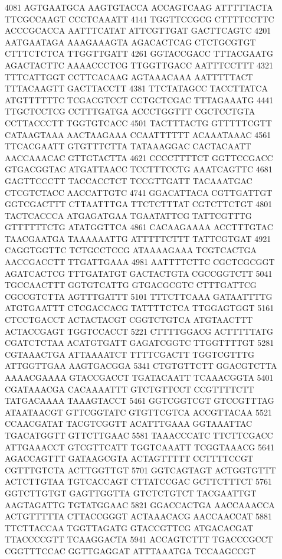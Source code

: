 \begin{addmargin}{0.1\textwidth}
\begin{footnotesize}
\begin{LVerbatim}[commandchars=\\\{\}]
\color{red}4081 AGTGAATGCA AAGTGTACCA ACCAGTCAAG ATTTTTACTA TTCGCCAAGT CCCTCAAATT 
\color{red}4141 TGGTTCCGCG CTTTTCCTTC ACCCGCACCA AATTTCATAT ATTCGTTGAT GACTTCAGTC 
\color{red}4201 AATGAATAGA AAAGAAAGTA AGACACTCAG CTCTGCGTGT CTTTCTCTCA TTGGTTGATT 
\color{red}4261 GGTACCGACC TTTACGAATG AGACTACTTC AAAACCCTCG TTGGTTGACC AATTTCCTTT 
\color{red}4321 TTTCATTGGT CCTTCACAAG AGTAAACAAA AATTTTTACT TTTACAAGTT GACTTACCTT 
\color{red}4381 TTCTATAGCC TACCTTATCA ATGTTTTTTC TCGACGTCCT CCTGCTCGAC TTTAGAAATG 
\color{red}4441 TTGCTCCTCG CCTTTGATGA ACCCTGGTTT CGCTCCTGTA CCTTACCCTT TGGTGTCACC 
\color{red}4501 TACTTTACTG GTTTTTCGTT CATAAGTAAA AACTAAGAAA CCAATTTTTT ACAAATAAAC 
\color{red}4561 TTCACGAATT GTGTTTCTTA TATAAAGGAC CACTACAATT AACCAAACAC GTTGTACTTA 
\color{red}4621 CCCCTTTTCT GGTTCCGACC GTGACGGTAC ATGATTAACC TCCTTTCCTG AAATCAGTTC 
\color{red}4681 GAGTTCCCTT TACCACCTCT TCCGTTGATT TACAAATGAC CTCGTCTACC AACCATTGTC 
\color{red}4741 GGACATTACA CGTTGATTGT GGTCGACTTT CTTAATTTGA TTCTCTTTAT CGTCTTCTGT 
\color{red}4801 TACTCACCCA ATGAGATGAA TGAATATTCG TATTCGTTTG GTTTTTTCTG ATATGGTTCA 
\color{red}4861 CACAAGAAAA ACCTTTGTAC TAACGAATGA TAAAAAATTG ATTTTTCTTT TATTCGTGAT 
\color{red}4921 CAGGTGGTTC TCTGCCTCCG ATAAAAGAAA TCGTCACTGA AACCGACCTT TTGATTGAAA 
\color{red}4981 AATTTTCTTC CGCTCGCGGT AGATCACTCG TTTGATATGT GACTACTGTA CGCCGGTCTT 
\color{red}5041 TGCCAACTTT GGTGTCATTG GTGACGCGTC CTTTGATTCG CGCCGTCTTA AGTTTGATTT 
\color{red}5101 TTTCTTCAAA GATAATTTTG ATGTGAATTT CTCGACCACG TATTTTCTCA TTGGAGTGGT 
\color{red}5161 CTCCTGACCT ACTACTACGT CGGTCTGTCA ATGTAACTTT ACTACCGAGT TGGTCCACCT 
\color{red}5221 CTTTTGGACG ACTTTTTATG CGATCTCTAA ACATGTGATT GAGATCGGTC TTGGTTTTGT 
\color{red}5281 CGTAAACTGA ATTAAAATCT TTTTCGACTT TGGTCGTTTG ATTGGTTGAA AAGTGACGGA 
\color{red}5341 CTGTGTTCTT GGACGTCTTA AAAACGAAAA GTACCGACCT TGATACAATT TCAAACGGTA 
\color{red}5401 CGATAAACGA CACAAAATTT GTCTGTTCCT CCGTTTTCTT TATGACAAAA TAAAGTACCT 
\color{red}5461 GGTCGGTCGT GTCCGTTTAG ATAATAACGT GTTCGGTATC GTGTTCGTCA ACCGTTACAA 
\color{red}5521 CCAACGATAT TACGTCGGTT ACATTTGAAA GGTAAATTAC TGACATGGTT GTTCTTGAAC 
\color{red}5581 TAAACCCATC TTCTTCGACC ATTGAAACCT GTCGTTCATT TGGTCAAATT TCGGTAAACG 
\color{red}5641 AGACCAGTTT GATAAGCGTA ACTAGTTTTT CCTTTTCCGT CGTTTGTCTA ACTTGGTTGT 
\color{red}5701 GGTCAGTAGT ACTGGTGTTT ACTCTTGTAA TGTCACCAGT CTTATCCGAC GCTTCTTTCT 
\color{red}5761 GGTCTTGTGT GAGTTGGTTA GTCTCTGTCT TACGAATTGT AAGTAGATTG TGTATGGAAC 
\color{red}5821 GGACCACTGA AACCAAACCA ACTGTTTTTA CTTACCGGGT ACTAAACACG AACCAACCAT 
\color{red}5881 TTCTTACCAA TGGTTAGATG GTACCGTTCG ATGACACGAT TTACCCCGTT TCAAGGACTA 
\color{red}5941 ACCAGTCTTT TGACCCGCCT CGGTTTCCAC GGTTGAGGAT ATTTAAATGA TCCAAGCCGT 

\end{LVerbatim}
\end{footnotesize}
\end{addmargin}
